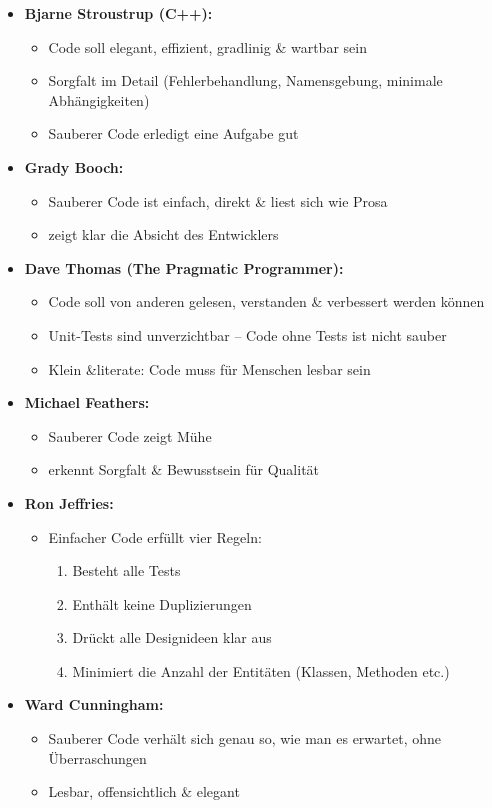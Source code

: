 \documentclass[12pt,a4paper,oneside]{article}
\begin{document}
\begin{itemize}
\item \textbf{Bjarne Stroustrup (C++):}
\begin{itemize}
\item Code soll elegant, effizient, gradlinig \& wartbar sein
\item Sorgfalt im Detail (Fehlerbehandlung, Namensgebung, minimale Abhängigkeiten)
\item Sauberer Code erledigt eine Aufgabe gut
\end{itemize}
\item \textbf{Grady Booch:}
\begin{itemize}
\item Sauberer Code ist einfach, direkt \& liest sich wie Prosa
\item zeigt klar die Absicht des Entwicklers
\end{itemize}
\item \textbf{Dave Thomas (The Pragmatic Programmer):}
\begin{itemize}
\item Code soll von anderen gelesen, verstanden \& verbessert werden können
\item Unit-Tests sind unverzichtbar – Code ohne Tests ist nicht sauber
\item Klein \&literate: Code muss für Menschen lesbar sein
\end{itemize}
\item \textbf{Michael Feathers:}
\begin{itemize}
\item Sauberer Code zeigt Mühe
\item erkennt Sorgfalt \& Bewusstsein für Qualität
\end{itemize}
\item \textbf{Ron Jeffries:}
\begin{itemize}
\item Einfacher Code erfüllt vier Regeln:
\begin{enumerate}
\item Besteht alle Tests
\item Enthält keine Duplizierungen
\item Drückt alle Designideen klar aus
\item Minimiert die Anzahl der Entitäten (Klassen, Methoden etc.)
\end{enumerate}
\end{itemize}
\item \textbf{Ward Cunningham:}
\begin{itemize}
\item Sauberer Code verhält sich genau so, wie man es erwartet, ohne Überraschungen
\item Lesbar, offensichtlich \& elegant
\end{itemize}
\end{itemize}
\end{document}
